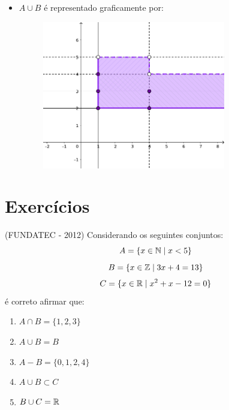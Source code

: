 \begin{itemize}
 \begin{itemize}
 \item $A \cup B$ é representado graficamente por:
    \begin{figure}[H]
 \centering
 \includegraphics[width=8cm]{./cap_conjnum/figs/cartesianouniao}
 \end{figure}

 \end{itemize}

\end{itemize}

\section{Exercícios}

\begin{exer}
(FUNDATEC - 2012)  Considerando os seguintes conjuntos:
         \[ A = \{x \in \mathbb{N} \mid x < 5\}\]
         \[ B = \{x \in \mathbb{Z} \mid 3x + 4 = 13\}\]
         \[ C = \{x \in \mathbb{R} \mid x^2 + x - 12 = 0 \} \]
   é correto afirmar que:
   \begin{enumerate}
   \item $A \cap B = \{ 1,2,3\}$
   \item $A \cup B = B$
   \item $A - B = \{0,1,2,4\}$
   \item $A \cup B \subset C$
   \item $B \cup C= \mathbb{R}$
  \end{enumerate}
\end{exer}

